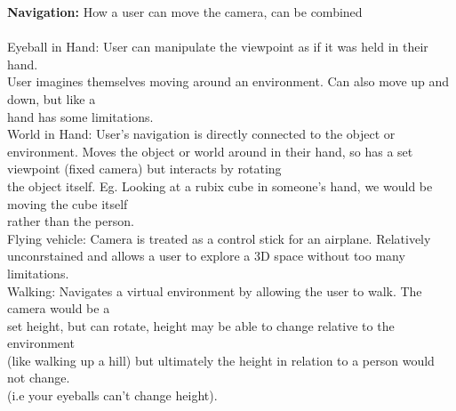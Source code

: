 \documentclass[a4paper,10pt]{article}
\begin{document}
\noindent \textcolor{Emerald}{\textbf{Navigation:}} How a user can move the camera, can be combined \\\\
\indent \textcolor{Emerald}{Eyeball in Hand:} User can manipulate the viewpoint as if it was held in their hand. \\ 
\indent User imagines themselves moving around an environment. Can also move up and down, but like a \\ 
\indent hand has some limitations. \\
\indent \textcolor{Emerald}{World in Hand:} User's navigation is directly connected to the object or environment. Moves the \indent object or world around in their hand, so has a set viewpoint (fixed camera) but interacts by rotating \\ 
\indent the object itself. Eg. Looking at a rubix cube in someone's hand, we would be moving the cube itself \\
\indent rather than the person.  \\
\indent \textcolor{Emerald}{Flying vehicle:} Camera is treated as a control stick for an airplane. Relatively unconrstained and \indent allows a user to explore a 3D space without too many limitations.  \\
\indent \textcolor{Emerald}{Walking:} Navigates a virtual environment by allowing the user to walk. The camera would be a \\
\indent set height, but can rotate, height may be able to change relative to the environment \\ 
\indent (like walking up a hill) but ultimately the height in relation to a person would not change. \\ 
\indent (i.e your eyeballs can't change height).  \\
\end{document}
